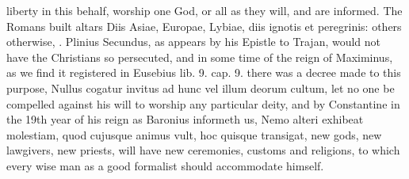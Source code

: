 {liberty in this behalf, worship one God, or all as they will, and are
informed. The Romans built altars Diis Asiae, Europae, Lybiae, diis
ignotis et peregrinis: others otherwise, \etc{}. Plinius Secundus, as
appears by his Epistle to Trajan, would not have the Christians so
persecuted, and in some time of the reign of Maximinus, as we find it
registered in Eusebius lib. 9. cap. 9. there was a decree made to this
purpose, Nullus cogatur invitus ad hunc vel illum deorum cultum, let no
one be compelled against his will to worship any particular deity, and
by Constantine in the 19th year of his reign as Baronius
informeth us, Nemo alteri exhibeat molestiam, quod cujusque animus
vult, hoc quisque transigat, new gods, new lawgivers, new priests, will
have new ceremonies, customs and religions, to which every wise man as
a good formalist should accommodate himself.


}
